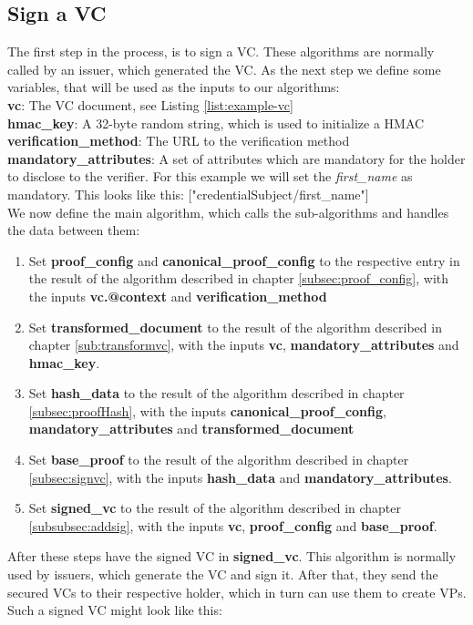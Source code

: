 \documentclass[
	a4paper               %
	,BCOR=0mm            %
	,bibliography=totoc   %
	,listof=totoc         %
	,monolingual
	,twoside=false
]{bfhthesis}              %
\begin{document}
\subsection{Sign a VC}
The first step in the process, is to sign a VC.
These algorithms are normally called by an issuer, which generated the VC.
As the next step we define some variables, that will be used as the inputs to our algorithms:\\
\textbf{vc}: The VC document, see Listing \ref{list:example-vc}\\
\textbf{hmac\_key}: A 32-byte random string, which is used to initialize a HMAC\\
\textbf{verification\_method}: The URL to the verification method\\
\textbf{mandatory\_attributes}: A set of attributes which are mandatory for the holder to disclose to the verifier. For this example we will set the \textit{first\_name} as mandatory. This looks like this: ["credentialSubject/first\_name"]\\

We now define the main algorithm, which calls the sub-algorithms and handles the data between them:
\begin{enumerate}
	\item Set \textbf{proof\_config} and \textbf{canonical\_proof\_config} to the respective entry in the result of the algorithm described in chapter \ref{subsec:proof_config}, with the inputs \textbf{vc.@context} and \textbf{verification\_method}
	\item Set \textbf{transformed\_document} to the result of the algorithm described in chapter \ref{sub:transformvc}, with the inputs \textbf{vc}, \textbf{mandatory\_attributes} and \textbf{hmac\_key}.
	\item Set \textbf{hash\_data} to the result of the algorithm described in chapter \ref{subsec:proofHash}, with the inputs \textbf{canonical\_proof\_config}, \textbf{mandatory\_attributes} and \textbf{transformed\_document}
	\item Set \textbf{base\_proof} to the result of the algorithm described in chapter \ref{subsec:signvc}, with the inputs \textbf{hash\_data} and \textbf{mandatory\_attributes}.
	\item Set \textbf{signed\_vc} to the result of the algorithm described in chapter \ref{subsubsec:addsig}, with the inputs \textbf{vc}, \textbf{proof\_config} and \textbf{base\_proof}.
\end{enumerate}

After these steps have the signed VC in \textbf{signed\_vc}.
This algorithm is normally used by issuers, which generate the VC and sign it.
After that, they send the secured VCs to their respective holder, which in turn can use them to create VPs.
Such a signed VC might look like this:
\end{document}
